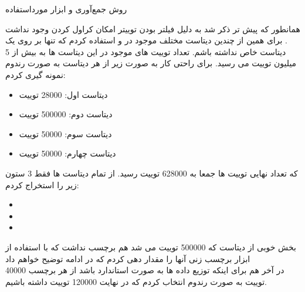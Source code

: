 \Section
{روش جمع‌آوری و ابزار مورداستفاده}
{
	همانطور که پیش تر ذکر شد به دلیل فیلتر بودن توییتر امکان کراول کردن وجود نداشت . برای همین از چندین دیتاست مختلف موجود در 
	 و 
	استفاده کردم که تنها بر روی یک دیتاست خاص 
	نداشته باشم.
	تعداد توییت های موجود در این دیتاست ها به بیش از 5 میلیون توییت می رسید. برای راحتی کار به صورت زیر از هر دیتاست به صورت رندوم نمونه گیری کردم:
	\begin{itemize}
		\item دیتاست اول: 28000 توییت
		\item دیتاست دوم: 500000 توییت
		\item دیتاست سوم: 50000 توییت
		\item دیتاست چهارم: 50000 توییت
	\end{itemize}
	که تعداد نهایی توییت ها جمعا به 628000 توییت رسید. از تمام دیتاست ها فقط 3 ستون زیر را استخراج کردم:
	\begin{itemize}
		\item {}
		\item {}
		\item {}
	\end{itemize}
	بخش خوبی از دیتاست که 500000 توییت می شد هم برچسب نداشت که با استفاده از ابزار برچسب زنی آنها را مقدار دهی کردم که در ادامه توضیح خواهم داد
	\\ در آخر هم برای اینکه توزیع داده ها به صورت استاندارد باشد از هر برچسب 
	40000
	توییت به صورت رندوم انتخاب کردم که در نهایت
	120000
	توییت داشته باشیم.
}